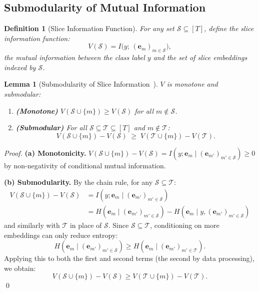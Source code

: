 \documentclass[11pt,a4paper]{article}
\newtheorem{lemma}[theorem]{Lemma}
\newtheorem{definition}{Definition}[section]
\newcommand{\be}{\mathbf{e}}
\newcommand{\cS}{\mathcal{S}}
\newcommand{\HH}{H}
\newcommand{\II}{I}
\begin{document}
\subsection{Submodularity of Mutual Information}

\begin{definition}[Slice Information Function]
For any set $\cS \subseteq [T]$, define the \emph{slice information function}:
\[
  V(\cS) = \II\bigl(y;\, (\be_m)_{m \in \cS}\bigr),
\]
the mutual information between the class label $y$ and the set of slice embeddings
indexed by $\cS$.
\end{definition}

\begin{lemma}[Submodularity of Slice Information~{\cite{krause2014,cover2006}}]
\label{lem:submodular}
$V$ is monotone and submodular:
\begin{enumerate}[label=(\alph*)]
  \item \textbf{(Monotone)} $V(\cS \cup \{m\}) \geq V(\cS)$ for all $m \notin \cS$.
  \item \textbf{(Submodular)} For all $\cS \subseteq \mathcal{T} \subseteq [T]$ and
    $m \notin \mathcal{T}$:
    \[
      V(\cS \cup \{m\}) - V(\cS) \;\geq\; V(\mathcal{T} \cup \{m\}) - V(\mathcal{T}).
    \]
\end{enumerate}
\end{lemma}

\begin{proof}
\textbf{(a) Monotonicity.}
$V(\cS \cup \{m\}) - V(\cS) = \II(y; \be_m \mid (\be_{m'})_{m' \in \cS}) \geq 0$
by non-negativity of conditional mutual information.

\textbf{(b) Submodularity.}
By the chain rule, for any $\cS \subseteq \mathcal{T}$:
\begin{align*}
  V(\cS \cup \{m\}) - V(\cS)
    &= \II(y; \be_m \mid (\be_{m'})_{m' \in \cS}) \\
    &= \HH(\be_m \mid (\be_{m'})_{m' \in \cS}) - \HH(\be_m \mid y, (\be_{m'})_{m' \in \cS})
\end{align*}
and similarly with $\mathcal{T}$ in place of $\cS$.  Since $\cS \subseteq \mathcal{T}$,
conditioning on more embeddings can only reduce entropy:
\[
  \HH(\be_m \mid (\be_{m'})_{m' \in \cS}) \geq \HH(\be_m \mid (\be_{m'})_{m' \in \mathcal{T}}).
\]
Applying this to both the first and second terms (the second by data processing),
we obtain:
\[
  V(\cS \cup \{m\}) - V(\cS) \geq V(\mathcal{T} \cup \{m\}) - V(\mathcal{T}).
\]
\qed
\end{proof}
\end{document}

